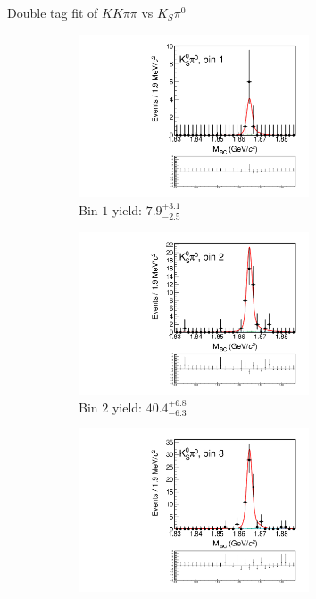 \documentclass{beamer}
\begin{document}
\begin{frame}{Double tag fit of $KK\pi\pi$ vs $K_S\pi^0$}
  \begin{figure}
    \centering
    \begin{subfigure}{0.5\textwidth}
      \centering
      \includegraphics[width=0.75\textwidth,trim={0 5cm 0 0},clip=true]{Plots/DoubleTagYield_DoubleTag_CP_KKpipi_vs_KSpi0_SignalBin1.pdf}
      \caption{Bin $1$ yield: $7.9_{-2.5}^{+3.1}$}
    \end{subfigure}%
    \begin{subfigure}{0.5\textwidth}
      \centering
      \includegraphics[width=0.75\textwidth,trim={0 5cm 0 0},clip=true]{Plots/DoubleTagYield_DoubleTag_CP_KKpipi_vs_KSpi0_SignalBin2.pdf}
      \caption{Bin $2$ yield: $40.4_{-6.3}^{+6.8}$}
    \end{subfigure}
    \begin{subfigure}{0.5\textwidth}
      \centering
      \includegraphics[width=0.75\textwidth,trim={0 5cm 0 0},clip=true]{Plots/DoubleTagYield_DoubleTag_CP_KKpipi_vs_KSpi0_SignalBin3.pdf}

\end{subfigure}
\end{figure}
\end{frame}
\end{document}
